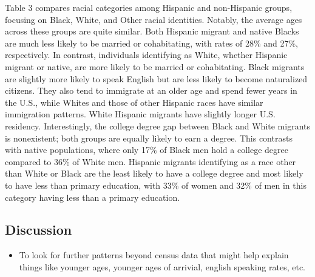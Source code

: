 \documentclass[
]{article}
\providecommand{\tightlist}{%
  \setlength{\itemsep}{0pt}\setlength{\parskip}{0pt}}\usepackage{longtable,booktabs,array}
\begin{document}
Table 3 compares racial categories among Hispanic and non-Hispanic
groups, focusing on Black, White, and Other racial identities. Notably,
the average ages across these groups are quite similar. Both Hispanic
migrant and native Blacks are much less likely to be married or
cohabitating, with rates of 28\% and 27\%, respectively. In contrast,
individuals identifying as White, whether Hispanic migrant or native,
are more likely to be married or cohabitating. Black migrants are
slightly more likely to speak English but are less likely to become
naturalized citizens. They also tend to immigrate at an older age and
spend fewer years in the U.S., while Whites and those of other Hispanic
races have similar immigration patterns. White Hispanic migrants have
slightly longer U.S. residency. Interestingly, the college degree gap
between Black and White migrants is nonexistent; both groups are equally
likely to earn a degree. This contrasts with native populations, where
only 17\% of Black men hold a college degree compared to 36\% of White
men. Hispanic migrants identifying as a race other than White or Black
are the least likely to have a college degree and most likely to have
less than primary education, with 33\% of women and 32\% of men in this
category having less than a primary education.

\subsection{Discussion}\label{discussion}

\begin{itemize}
\tightlist
\item
  To look for further patterns beyond census data that might help
  explain things like younger ages, younger ages of arrivial, english
  speaking rates, etc.
\end{itemize}

\newpage
\end{document}
